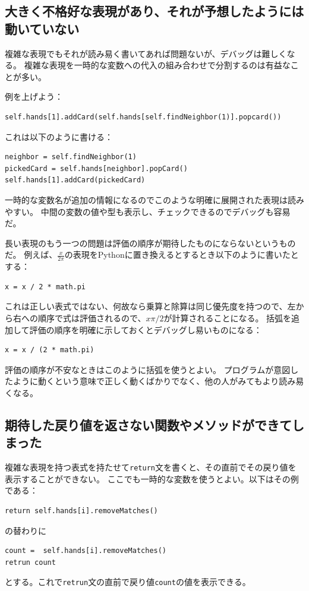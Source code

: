 \documentclass[a4j,12pt,makeidx]{jbook}
\begin{document}
\subsection*{大きく不格好な表現があり、それが予想したようには動いていない}
複雑な表現でもそれが読み易く書いてあれば問題ないが、デバッグは難しくなる。
複雑な表現を一時的な変数への代入の組み合わせで分割するのは有益なことが多い。\par
例を上げよう：
\begin{verbatim}
self.hands[1].addCard(self.hands[self.findNeighbor(1)].popcard())
\end{verbatim}
これは以下のように書ける：
\begin{verbatim}
neighbor = self.findNeighbor(1)
pickedCard = self.hands[neighbor].popCard()
self.hands[1].addCard(pickedCard)
\end{verbatim}
一時的な変数名が追加の情報になるのでこのような明確に展開された表現は読みやすい。
中間の変数の値や型も表示し、チェックできるのでデバッグも容易だ。\par
長い表現のもう一つの問題は評価の順序が期待したものにならないというものだ。
例えば、$\frac{x}{2 \pi}$の表現をPythonに置き換えるとするとき以下のように書いたとする：
\begin{verbatim}
x = x / 2 * math.pi
\end{verbatim}
これは正しい表式ではない、何故なら乗算と除算は同じ優先度を持つので、左から右への順序で式は評価されるので、$x \pi / 2$が計算されることになる。
括弧を追加して評価の順序を明確に示しておくとデバッグし易いものになる：
\begin{verbatim}
x = x / (2 * math.pi)
\end{verbatim}
評価の順序が不安なときはこのように括弧を使うとよい。
プログラムが意図したように動くという意味で正しく動くばかりでなく、他の人がみてもより読み易くなる。
%
\subsection*{期待した戻り値を返さない関数やメソッドができてしまった}
複雑な表現を持つ表式を持たせて{\tt return}文を書くと、その直前でその戻り値を表示することができない。
ここでも一時的な変数を使うとよい。以下はその例である：
\begin{verbatim}
return self.hands[i].removeMatches()
\end{verbatim}
の替わりに
\begin{verbatim}
count =  self.hands[i].removeMatches()
retrun count
\end{verbatim}
とする。これで{\tt retrun}文の直前で戻り値{\tt count}の値を表示できる。
%
\end{document}
